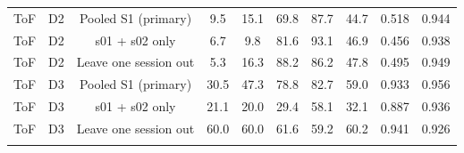 \begin{tabular}{@{}llcccccccc@{}}
\addlinespace
ToF & D2 & Pooled S1 (primary) & 9.5 & 15.1 & 69.8 & 87.7 & 44.7 & 0.518 & 0.944 \\ %
ToF & D2 & s01 + s02 only & 6.7 & 9.8 & 81.6 & 93.1 & 46.9 & 0.456 & 0.938 \\ %
ToF & D2 & Leave one session out & 5.3 & 16.3 & 88.2 & 86.2 & 47.8 & 0.495 & 0.949 \\ %
\addlinespace
ToF & D3 & Pooled S1 (primary) & 30.5 & 47.3 & 78.8 & 82.7 & 59.0 & 0.933 & 0.956 \\ %
ToF & D3 & s01 + s02 only & 21.1 & 20.0 & 29.4 & 58.1 & 32.1 & 0.887 & 0.936 \\ %
ToF & D3 & Leave one session out & 60.0 & 60.0 & 61.6 & 59.2 & 60.2 & 0.941 & 0.926 \\ %
\addlinespace
\bottomrule
\end{tabular}
